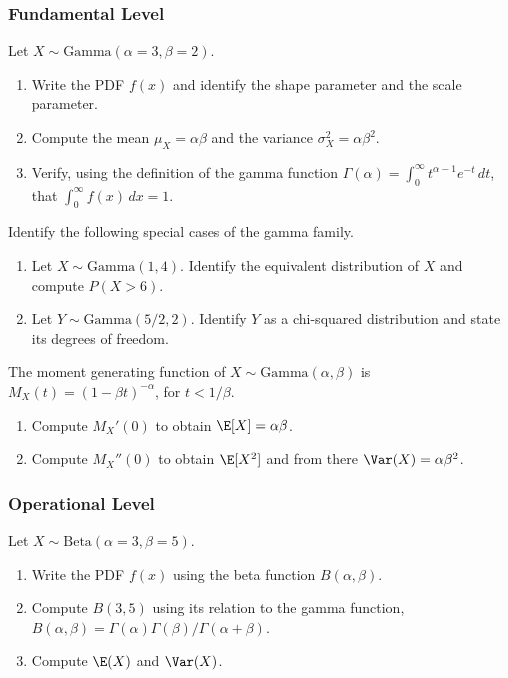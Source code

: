 \subsubsection*{Fundamental Level}

\begin{problema}
	\label{prob:4.7.1}
	Let $X \sim \text{Gamma}(\alpha=3, \beta=2)$.
	\begin{enumerate}
		\item Write the PDF $f(x)$ and identify the shape parameter and the scale parameter.
		\item Compute the mean $\mu_X = \alpha\beta$ and the variance $\sigma_X^{2} = \alpha\beta^{2}$.
		\item Verify, using the definition of the gamma function $\Gamma(\alpha) = \int_0^\infty t^{\alpha-1}e^{-t}\,dt$, that $\int_0^\infty f(x)\,dx = 1$.
	\end{enumerate}
\end{problema}

\begin{problema}
	\label{prob:4.7.2}
	Identify the following special cases of the gamma family.
	\begin{enumerate}
		\item Let $X \sim \text{Gamma}(1, 4)$. Identify the equivalent distribution of $X$ and compute $P(X > 6)$.
		\item Let $Y \sim \text{Gamma}(5/2, 2)$. Identify $Y$ as a chi-squared distribution and state its degrees of freedom.
	\end{enumerate}
\end{problema}

\begin{problema}
	\label{prob:4.7.3}
	The moment generating function of $X \sim \text{Gamma}(\alpha, \beta)$ is $M_{X}(t) = (1-\beta t)^{-\alpha}$, for $t < 1/\beta$.
	\begin{enumerate}
		\item Compute $M_{X}'(0)$ to obtain $\E[X] = \alpha\beta$.
		\item Compute $M_{X}''(0)$ to obtain $\E[X^{2}]$ and from there $\Var(X) = \alpha\beta^{2}$.
	\end{enumerate}
\end{problema}

\subsubsection*{Operational Level}

\begin{problema}
	\label{prob:4.7.4}
	Let $X \sim \text{Beta}(\alpha=3, \beta=5)$.
	\begin{enumerate}
		\item Write the PDF $f(x)$ using the beta function $B(\alpha,\beta)$.
		\item Compute $B(3,5)$ using its relation to the gamma function, $B(\alpha,\beta) = \Gamma(\alpha)\Gamma(\beta)/\Gamma(\alpha+\beta)$.
		\item Compute $\E(X)$ and $\Var(X)$.
	\end{enumerate}
\end{problema}

